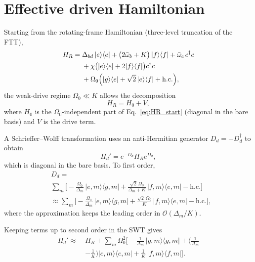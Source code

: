 \section{Effective driven Hamiltonian}
\label{SWT}

Starting from the rotating-frame Hamiltonian (three-level truncation of the FTT),
\begin{equation}
\label{eq:HR_start}
\begin{aligned}
H_R =\;&
\Delta_{bd}\,|e\rangle\langle e|
+\bigl(2\bar\omega_b + K\bigr)\,|f\rangle\langle f|
+\bar\omega_c\,c^\dagger c \\
&+\chi\bigl(|e\rangle\langle e|+2|f\rangle\langle f|\bigr)c^\dagger c \\
&+\Omega_0\Bigl(|g\rangle\langle e|+
\sqrt{2}\,|e\rangle\langle f|+
\mathrm{h.c.}\Bigr),
\end{aligned}
\end{equation}
the weak-drive regime $\Omega_0\ll K$ allows the decomposition
\begin{equation}
\label{eq:H0_plus_V}
H_R = H_0 + V,
\end{equation}
where $H_0$ is the $\Omega_0$-independent part of Eq.~\eqref{eq:HR_start} (diagonal in the bare basis) and $V$ is the drive term.

A Schrieffer--Wolff transformation uses an anti-Hermitian generator $D_d=-D_d^\dagger$ to obtain
\begin{equation}
\label{eq:SWT_def}
H_d' = e^{-D_d}H_R e^{D_d},
\end{equation}
which is diagonal in the bare basis. To first order,
\begin{equation}
\label{eq:Dd_first_order}
\begin{aligned}
&D_d=\\
&
\sum_{m}\Biggl[
-\frac{\Omega_0}{\Delta_m}\,|e,m\rangle\langle g,m|
+\frac{\sqrt{2}\,\Omega_0}{\Delta_m+K}\,|f,m\rangle\langle e,m|
-\mathrm{h.c.}
\Biggr] \\
&\approx
\sum_{m}\Biggl[
-\frac{\Omega_0}{\Delta_m}\,|e,m\rangle\langle g,m|
+\frac{\sqrt{2}\,\Omega_0}{K}\,|f,m\rangle\langle e,m|
-\mathrm{h.c.}
\Biggr],
\end{aligned}
\end{equation}
where the approximation keeps the leading order in $\mathcal{O}(\Delta_m/K)$.

Keeping terms up to second order in the SWT gives
\begin{align}
H_d' \approx\;& H_R + \sum_m \Omega_0^2\Biggl[
-\frac{1}{\Delta_m}\,|g,m\rangle\langle g,m|
+(\frac{1}{\Delta_m}
\nonumber\\
&-\frac{1}{K}) |e,m\rangle\langle e,m|
+\frac{1}{K}\,|f,m\rangle\langle f,m|
\Biggr].
\label{eq:Hd_second_order_explicit}
\end{align}

